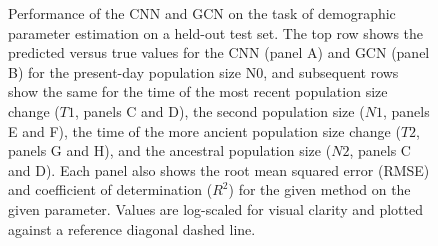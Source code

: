 \begin{figure}
    \centering
    \caption[Performance of the CNN and GCN on the task of demographic parameter estimation on a held-out test set]{Performance of the CNN and GCN on the task of demographic parameter estimation on a held-out test set. The top row shows the predicted versus true values for the CNN (panel A) and GCN (panel B) for the present-day population size N0, and subsequent rows show the same for the time of the most recent population size change ($T1$, panels C and D), the second population size ($N1$, panels E and F), the time of the more ancient population size change ($T2$, panels G and H), and the ancestral population size ($N2$, panels C and D). Each panel also shows the root mean squared error (RMSE) and coefficient of determination ($R^2$) for the given method on the given parameter. Values are log-scaled for visual clarity and plotted against a reference diagonal dashed line.}
    \label{fig:2_7}
\end{figure}

